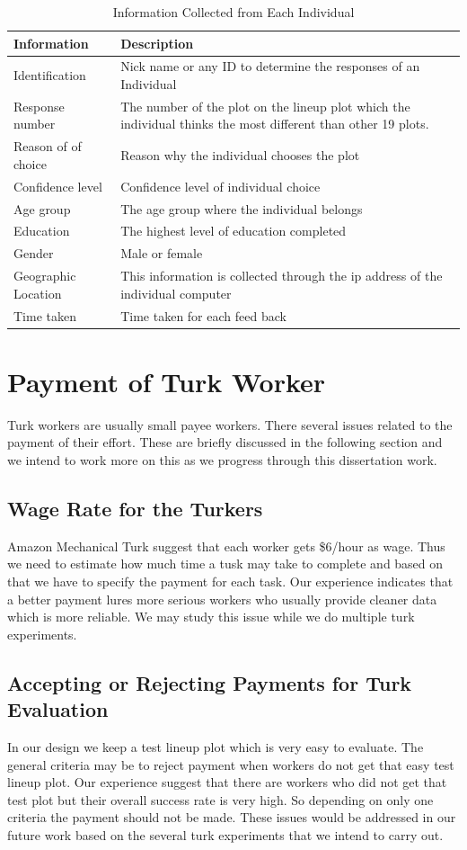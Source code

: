 \documentclass{article}
\begin{document}
\begin{table}[hbtp]
\caption{Information Collected from Each Individual}
\centering 
\begin{tabular}{lp{8cm}} 
\hline
Information &  Description \\ %
\hline
Identification & Nick name or any ID to determine the responses of an Individual \\
Response number & The number of the plot on the lineup plot which the individual thinks the most different than other 19 plots.\\ 
Reason of of choice & Reason why the individual chooses the plot \\
Confidence level & Confidence level of individual choice \\ 
Age group& The age group where the individual belongs \\
Education & The highest level of education completed \\
Gender & Male or female \\
Geographic Location & This information is collected through the ip address of the individual computer \\ 
Time taken & Time taken for each feed back\\
\hline
\end{tabular}
\label{tbl:data_info}
\end{table}	

\section{Payment of Turk Worker} Turk workers are usually small payee workers. There several issues related to the payment of their effort. These are briefly discussed in the following section and we intend to work more on this as we progress through this dissertation work. 

\subsection{Wage Rate for the Turkers}Amazon Mechanical Turk suggest that each worker gets \$6/hour as wage. Thus we need to estimate how much time a tusk may take to complete and based on that we have to specify the payment for each task. Our experience indicates that a better payment lures more serious workers who usually provide cleaner data which is more reliable. We may study this issue while we do multiple turk experiments.

\subsection{Accepting or Rejecting Payments for Turk Evaluation} In our design we keep a test lineup plot which is very easy to evaluate. The general criteria may be to reject payment when workers do not get that easy test lineup plot. Our experience suggest that there are workers who did not get that test plot but their overall success rate is very high. So depending on only one criteria the payment should not be made. These issues would be addressed in our future work based on the several turk experiments that we intend to carry out.
\end{document}
